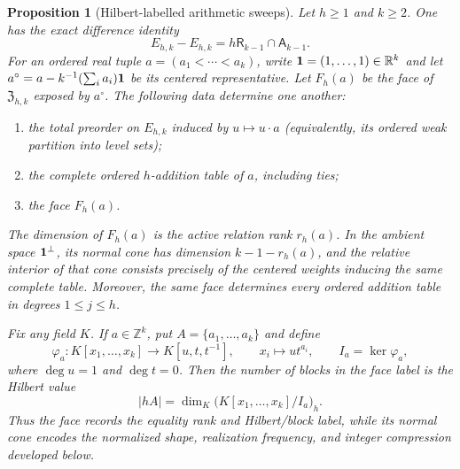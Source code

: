 \documentclass[11pt,reqno]{amsart}
\newtheorem{proposition}[theorem]{Proposition}
\theoremstyle{definition}
\theoremstyle{remark}
\begin{document}
\begin{proposition}[Hilbert-labelled arithmetic sweeps]
\label{prop:root-sweep-dictionary}
Let $h\geq1$ and $k\geq2$.  One has the exact difference identity
\begin{equation}\label{eq:root-sweep-difference}
 E_{h,k}-E_{h,k}=h\mathsf R_{k-1}\cap\mathsf A_{k-1}.
\end{equation}
For an ordered real tuple $a=(a_1<\cdots<a_k)$, write
\({\bf1}=(1,\ldots,1)\in\mathbb R^k\) and let
$a^\circ=a-k^{-1}(\sum_i a_i){\bf1}$ be its centered representative.  Let
$F_h(a)$ be the face of $\mathfrak Z_{h,k}$ exposed by $a^\circ$.  The
following data determine one another:
\begin{enumerate}[label=\textup{(\roman*)}]
\item the total preorder on $E_{h,k}$ induced by $u\mapsto u\cdot a$
      (equivalently, its ordered weak partition into level sets);
\item the complete ordered $h$-addition table of $a$, including ties;
\item the face $F_h(a)$.
\end{enumerate}
The dimension of $F_h(a)$ is the active relation rank $r_h(a)$.  In the
ambient space ${\bf1}^{\perp}$, its normal cone has dimension
$k-1-r_h(a)$, and the relative interior of that cone consists precisely of
the centered weights inducing the same complete table.  Moreover, the same
face determines every ordered addition table in degrees $1\leq j\leq h$.

Fix any field $K$.  If $a\in\mathbb Z^k$, put
$A=\{a_1,\ldots,a_k\}$ and define
\[
 \varphi_a:K[x_1,\ldots,x_k]\longrightarrow K[u,t,t^{-1}],
 \qquad x_i\longmapsto u t^{a_i},
 \qquad I_a=\ker\varphi_a,
\]
where $\deg u=1$ and $\deg t=0$.  Then the number of blocks in the face
label is the Hilbert value
\begin{equation}\label{eq:root-sweep-Hilbert-label}
 |hA|=\dim_K\bigl(K[x_1,\ldots,x_k]/I_a\bigr)_h.
\end{equation}
Thus the face records the equality rank and Hilbert/block label, while its
normal cone encodes the normalized shape, realization frequency, and integer
compression developed below.
\end{proposition}
\end{document}

